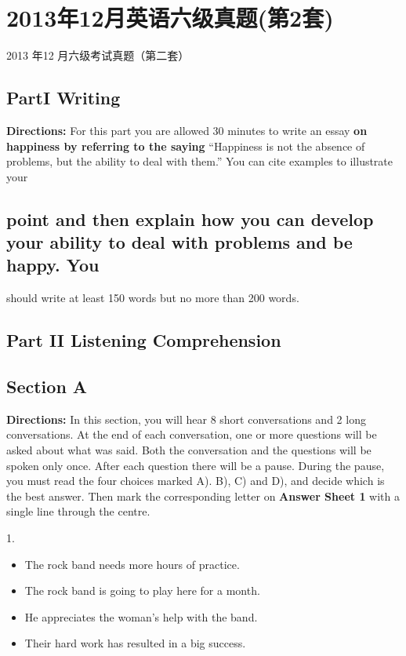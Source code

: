 \documentclass[UTF8,11pt]{ctexart}
\begin{document}
\section*{2013年12月英语六级真题(第2套)}
2013 年12 月六级考试真题（第二套）


\subsection*{\textbf{Part}I \textbf{Writing}}


\textbf{Directions:} For this part you are allowed 30 minutes to write an essay\textbf{ on happiness by referring to the saying} “Happiness is not the absence of problems, but the ability to deal with them.” You can cite examples to illustrate your


\subsection*{point and then\textbf{ explain how you can develop your ability to deal with problems and be happy.} You}


should write at least 150 words but no more than 200 words.


\subsection*{\textbf{Part II} \textbf{Listening Comprehension}}


\subsection*{\textbf{Section A}}


\textbf{Directions:} In this section, you will hear 8 short conversations and 2 long conversations. At the end of each conversation, one or more questions will be asked about what was said. Both the conversation and the questions will be spoken only once. After each question there will be a pause. During the pause, you must read the four choices marked A). B), C) and D), and decide which is the best answer. Then mark the corresponding letter on\textbf{ Answer Sheet 1} with a single line through the centre.


1.


\begin{itemize}[leftmargin=2em,itemsep=.2em,topsep=.4em]\item[A.] The rock band needs more hours of practice.
\item[B.] The rock band is going to play here for a month.
\item[C.] He appreciates the woman’s help with the band.
\item[D.] Their hard work has resulted in a big success.
\end{itemize}
\end{document}
